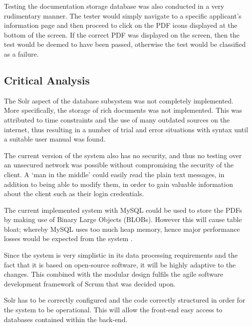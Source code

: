 \documentclass[journal]{IEEEtran}
\begin{document}
Testing the documentation storage database was also conducted in a very rudimentary manner. The tester would simply navigate to a specific applicant's information page and then proceed to click on the PDF icons displayed at the bottom of the screen. If the correct PDF was displayed on the screen, then the test would be deemed to have been passed, otherwise the test would be classified as a failure.


\subsection{Critical Analysis}

The Solr aspect of the database subsystem was not completely implemented. More specifically, the storage of rich documents was not implemented. This was attributed to time constraints and the use of many outdated sources on the internet, thus resulting in a number of trial and error situations with syntax until a suitable user manual was found. 

\hfill \break The current version of the system also has no security, and thus no testing over an unsecured network was possible without compromising the security of the client. A `man in the middle' \cite{tls} could easily read the plain text messages, in addition to being able to modify them, in order to gain valuable information about the client such as their login credentials.

\hfill \break The current implemented system with MySQL could be used to store the PDFs by making use of Binary Large Objects (BLOBs). However this will cause table bloat; whereby MySQL uses too much heap memory, hence major performance losses would be expected from the system \cite{tablebloat}.

\hfill \break Since the system is very simplistic in its data processing requirements and the fact that it is based on open-source software, it will be highly adaptive to the changes. This combined with the modular design fulfils the agile software development framework of Scrum that was decided upon.

\hfill \break Solr has to be correctly configured and the code correctly structured in order for the system to be operational. This will allow the front-end easy access to databases contained within the back-end.

\end{document}
